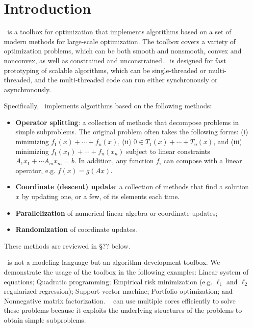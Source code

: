 \section{Introduction}
\pkg~is a toolbox for optimization that implements algorithms based on a set of modern methods for large-scale optimization. The toolbox covers a variety of optimization problems, which can  be both smooth and nonsmooth, convex and nonconvex, as well as constrained and unconstrained.  \pkg~is designed for fast prototyping of scalable algorithms, which can be  single-threaded or multi-threaded, and the multi-threaded code can run either synchronously or asynchronously. 

Specifically, \pkg~implements  algorithms based on  the following methods:
\begin{itemize}
\item \textbf{Operator splitting}: a collection of methods that decompose problems in simple subproblems. The original problem often takes the following forms: (i) minimizing $f_1(x)+\cdots+f_n(x)$, (ii) $0\in T_1(x)+\cdots +T_n(x)$, and (iii) minimizing $f_1(x_1)+\cdots+f_n(x_n)$ subject to linear constraints $A_1 x_1+\cdots A_m x_m=b$. In addition, any function $f_i$ can compose with a linear operator, e.g. $f(x) = g(Ax)$.

\item \textbf{Coordinate (descent) update}: a collection of methods that find a solution $x$ by updating one, or a few, of its elements each time.
\item \textbf{Parallelization} of numerical linear algebra or coordinate updates;
\item  \textbf{Randomization} of coordinate updates.
\end{itemize}
These methods are reviewed in \S?? below.

\pkg~is not a modeling language but an algorithm development toolbox. %
We demonstrate the usage of the toolbox in the following examples:
 Linear system of equations;
Quadratic programming;
Empirical risk minimization (e.g. $\ell_1$ and $\ell_2$ regularized  regression);
Support vector machine;
Portfolio optimization;
and Nonnegative matrix factorization. 
\pkg~ can use multiple cores efficiently to solve these  problems because it exploits the underlying structures of the problems to obtain simple subproblems. %

